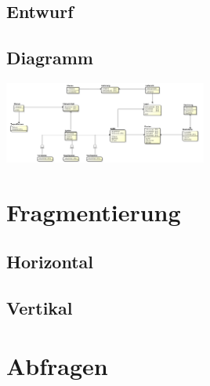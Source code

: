\documentclass[12pt,a4paper,draft]{report}
\begin{document}
	\section{Entwurf}
	\section{Diagramm}
	\includegraphics[width=0.5\textwidth]{ERD/MensaEr.png}
	\chapter{Fragmentierung}
	\section{Horizontal}
	\section{Vertikal}
	\chapter{Abfragen}
\end{document}
